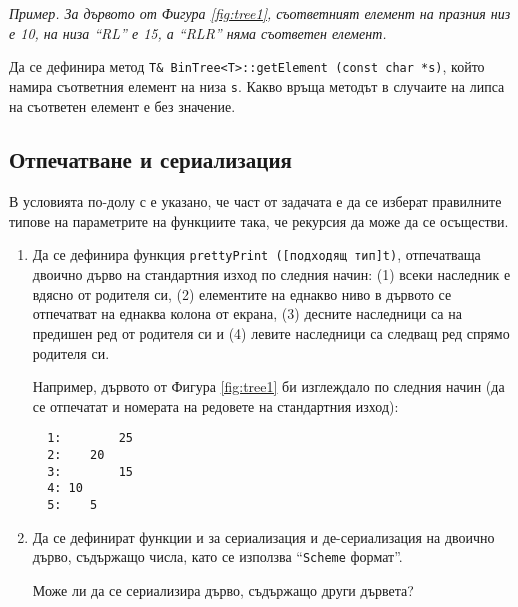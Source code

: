 \begin{enumerate}[]
	\textit{Пример. За 	дървото от Фигура \ref{fig:tree1}, съответният елемент на празния низ е 10, на низа ``RL'' е 15, а ``RLR'' няма съответен елемент.}

	Да се дефинира метод \texttt{T\& BinTree<T>::getElement (const char *s)}, който намира съответния елемент на низа \texttt{s}. Какво връща методът в случаите на липса на съответен елемент е без значение.


\end{enumerate}

\subsection {Отпечатване и сериализация}

\begin{mdframed}[hidealllines=true,backgroundcolor=gray!20]
  В условията по-долу с  е указано, че част от задачата е да се изберат правилните типове на параметрите на функциите така, че рекурсия да може да се осъществи.
\end{mdframed}
  
\begin{enumerate}[resume]

  \item Да се дефинира функция \texttt{prettyPrint ([подходящ тип]t)}, отпечатваща двоично дърво на стандартния изход по следния начин: (1) всеки наследник е вдясно от родителя си, (2) елементите на еднакво ниво в дървото се отпечатват на еднаква колона от екрана, (3) десните наследници са на предишен ред от родителя си и (4) левите наследници са следващ ред спрямо родителя си.

  Например, дървото от Фигура \ref{fig:tree1} би изглеждало по следния начин (да се отпечатат и номерата на редовете на стандартния изход):

  \begin{verbatim}
  1:        25
  2:    20
  3:        15
  4: 10
  5:    5
  \end{verbatim}



  \item Да се дефинират функции  и  за сериализация и де-сериализация на двоично дърво, съдържащо числа, като се използва ``\texttt{Scheme} формат''.
  
   Може ли да се сериализира дърво, съдържащо други дървета?
\end{enumerate}

